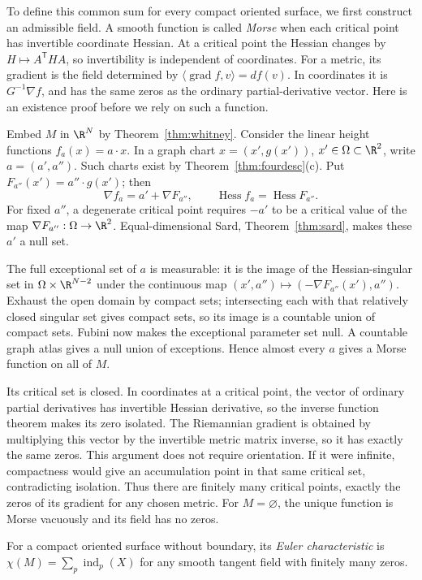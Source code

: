 To define this common sum for every compact oriented surface, we first construct an admissible field. A smooth function is called \emph{Morse} when each critical point has invertible coordinate Hessian. At a critical point the Hessian changes by $H\mapsto A^{\mathsf T}HA$, so invertibility is independent of coordinates. For a metric, its gradient is the field determined by $\langle\operatorname{grad}f,v\rangle=df(v)$. In coordinates it is $G^{-1}\nabla f$, and has the same zeros as the ordinary partial-derivative vector. Here is an existence proof before we rely on such a function.

Embed $M$ in $\R^N$ by Theorem~\ref{thm:whitney}. Consider the linear height functions $f_a(x)=a\cdot x$. In a graph chart $x=(x',g(x'))$, $x'\in\Omega\subset\R^2$, write $a=(a',a'')$. Such charts exist by Theorem~\ref{thm:fourdesc}(c). Put $F_{a''}(x')=a''\cdot g(x')$; then
\[
\nabla f_a=a'+\nabla F_{a''},\qquad
\operatorname{Hess}f_a=\operatorname{Hess}F_{a''}.
\]
For fixed $a''$, a degenerate critical point requires $-a'$ to be a critical value of the map $\nabla F_{a''}:\Omega\to\R^2$. Equal-dimensional Sard, Theorem~\ref{thm:sard}, makes these $a'$ a null set.

The full exceptional set of $a$ is measurable: it is the image of the Hessian-singular set in $\Omega\times\R^{N-2}$ under the continuous map $(x',a'')\mapsto(-\nabla F_{a''}(x'),a'')$. Exhaust the open domain by compact sets; intersecting each with that relatively closed singular set gives compact sets, so its image is a countable union of compact sets. Fubini now makes the exceptional parameter set null. A countable graph atlas gives a null union of exceptions. Hence almost every $a$ gives a Morse function on all of $M$.

Its critical set is closed. In coordinates at a critical point, the vector of ordinary partial derivatives has invertible Hessian derivative, so the inverse function theorem makes its zero isolated. The Riemannian gradient is obtained by multiplying this vector by the invertible metric matrix inverse, so it has exactly the same zeros. This argument does not require orientation. If it were infinite, compactness would give an accumulation point in that same critical set, contradicting isolation. Thus there are finitely many critical points, exactly the zeros of its gradient for any chosen metric. For $M=\varnothing$, the unique function is Morse vacuously and its field has no zeros.

\begin{definition}
For a compact oriented surface without boundary, its \emph{Euler characteristic} is $\chi(M)=\sum_p\operatorname{ind}_p(X)$ for any smooth tangent field with finitely many zeros.
\end{definition}

